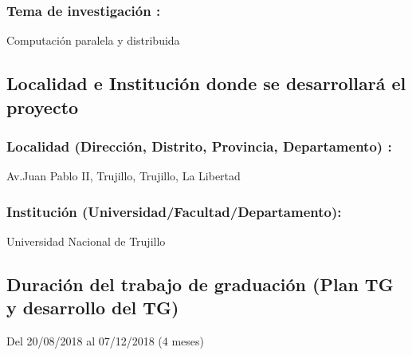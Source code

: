     \subsubsection{Tema de investigación :}
    Computación paralela y distribuida


\subsection{Localidad e Institución donde se desarrollará el proyecto }
  
    \subsubsection{Localidad (Dirección, Distrito, Provincia, Departamento) :} 
    Av.Juan Pablo II, Trujillo, Trujillo, La Libertad

    \subsubsection{Institución (Universidad/Facultad/Departamento):}
    Universidad Nacional de Trujillo

    \subsection{Duración del trabajo de graduación (Plan TG y desarrollo del TG)}
    Del 20/08/2018 al 07/12/2018 (4 meses)


\newpage